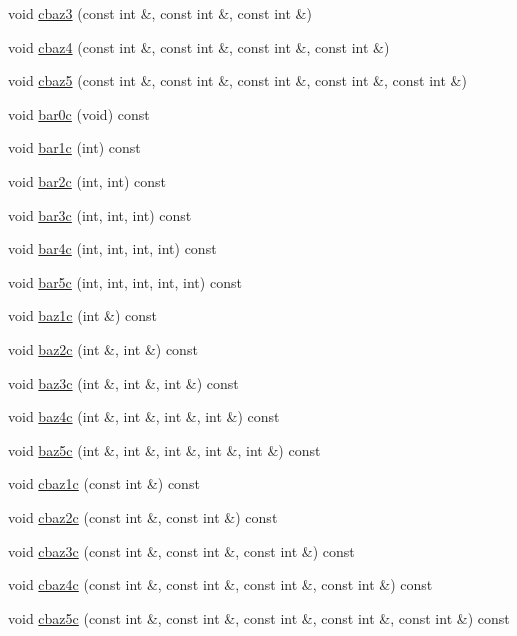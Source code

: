 \begin{DoxyCompactItemize}
\item 
void \hyperlink{classSimulatorTemplateTestCase_a89bc22b2a32d6cdf026e8f7209a2fbbd}{cbaz3} (const int \&, const int \&, const int \&)
\item 
void \hyperlink{classSimulatorTemplateTestCase_ac464eb9dcde4c15e5f63e9ae61fbc5a7}{cbaz4} (const int \&, const int \&, const int \&, const int \&)
\item 
void \hyperlink{classSimulatorTemplateTestCase_a68c3789ba056bcddf5f1575d4c9c0548}{cbaz5} (const int \&, const int \&, const int \&, const int \&, const int \&)
\item 
void \hyperlink{classSimulatorTemplateTestCase_a39381dd6c298ce90120f9ca020b51a44}{bar0c} (void) const 
\item 
void \hyperlink{classSimulatorTemplateTestCase_a17a705290d33ff9d9752c5fcd3ca549a}{bar1c} (int) const 
\item 
void \hyperlink{classSimulatorTemplateTestCase_a95e0f184170b9dd6ced11d3423752e9f}{bar2c} (int, int) const 
\item 
void \hyperlink{classSimulatorTemplateTestCase_a3440409096aee7c6dda41caab7cceeb6}{bar3c} (int, int, int) const 
\item 
void \hyperlink{classSimulatorTemplateTestCase_a4d7fde0e0f8f16201cb8731a65c84188}{bar4c} (int, int, int, int) const 
\item 
void \hyperlink{classSimulatorTemplateTestCase_af3908d1e88e554a76b7fcb7c6011182a}{bar5c} (int, int, int, int, int) const 
\item 
void \hyperlink{classSimulatorTemplateTestCase_af05903f120083bb45844f0a27234441f}{baz1c} (int \&) const 
\item 
void \hyperlink{classSimulatorTemplateTestCase_a6bec79b87dd5ccbd94c5e3af6b2462ea}{baz2c} (int \&, int \&) const 
\item 
void \hyperlink{classSimulatorTemplateTestCase_ab2f083ff848a8cffdb78e59bf9c5501c}{baz3c} (int \&, int \&, int \&) const 
\item 
void \hyperlink{classSimulatorTemplateTestCase_a71dcdfaf38733e4f3b6ae1d8e9c910fb}{baz4c} (int \&, int \&, int \&, int \&) const 
\item 
void \hyperlink{classSimulatorTemplateTestCase_a85db33b24c84a2e6c623e1bdac2b5b11}{baz5c} (int \&, int \&, int \&, int \&, int \&) const 
\item 
void \hyperlink{classSimulatorTemplateTestCase_abfb9fdb2a45df1b572e31d911da70af1}{cbaz1c} (const int \&) const 
\item 
void \hyperlink{classSimulatorTemplateTestCase_aceaaaedcf5defc916793b2b5d0908cae}{cbaz2c} (const int \&, const int \&) const 
\item 
void \hyperlink{classSimulatorTemplateTestCase_a231add1c9938940ecfde69823e44dfc4}{cbaz3c} (const int \&, const int \&, const int \&) const 
\item 
void \hyperlink{classSimulatorTemplateTestCase_a7ce3f71d66de538a7cd7c33faa0c4c17}{cbaz4c} (const int \&, const int \&, const int \&, const int \&) const 
\item 
void \hyperlink{classSimulatorTemplateTestCase_a2472cd2565c2643449dfe42756a0e58f}{cbaz5c} (const int \&, const int \&, const int \&, const int \&, const int \&) const 
\end{DoxyCompactItemize}
